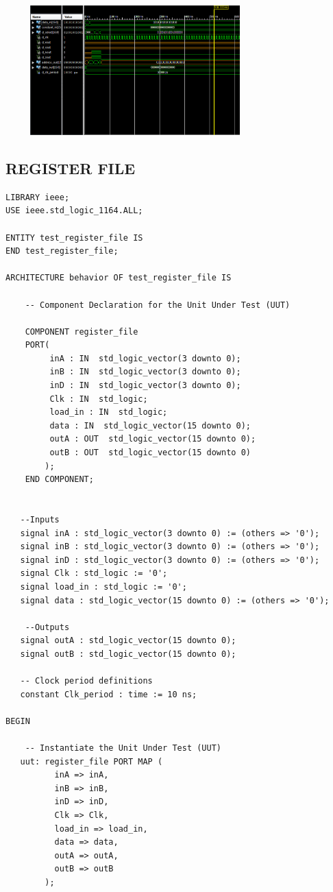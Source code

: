 \documentclass{article}
\begin{document}
\includegraphics[width=10cm, height=5cm]{test_data.png}
\pagebreak

\subsection{REGISTER FILE}\label{sec:result}

\begin{lstlisting}
LIBRARY ieee;
USE ieee.std_logic_1164.ALL;
 
ENTITY test_register_file IS
END test_register_file;
 
ARCHITECTURE behavior OF test_register_file IS 
 
    -- Component Declaration for the Unit Under Test (UUT)
 
    COMPONENT register_file
    PORT(
         inA : IN  std_logic_vector(3 downto 0);
         inB : IN  std_logic_vector(3 downto 0);
         inD : IN  std_logic_vector(3 downto 0);
         Clk : IN  std_logic;
         load_in : IN  std_logic;
         data : IN  std_logic_vector(15 downto 0);
         outA : OUT  std_logic_vector(15 downto 0);
         outB : OUT  std_logic_vector(15 downto 0)
        );
    END COMPONENT;
    

   --Inputs
   signal inA : std_logic_vector(3 downto 0) := (others => '0');
   signal inB : std_logic_vector(3 downto 0) := (others => '0');
   signal inD : std_logic_vector(3 downto 0) := (others => '0');
   signal Clk : std_logic := '0';
   signal load_in : std_logic := '0';
   signal data : std_logic_vector(15 downto 0) := (others => '0');

 	--Outputs
   signal outA : std_logic_vector(15 downto 0);
   signal outB : std_logic_vector(15 downto 0);

   -- Clock period definitions
   constant Clk_period : time := 10 ns;
 
BEGIN
 
	-- Instantiate the Unit Under Test (UUT)
   uut: register_file PORT MAP (
          inA => inA,
          inB => inB,
          inD => inD,
          Clk => Clk,
          load_in => load_in,
          data => data,
          outA => outA,
          outB => outB
        );


\end{lstlisting}
\end{document}
